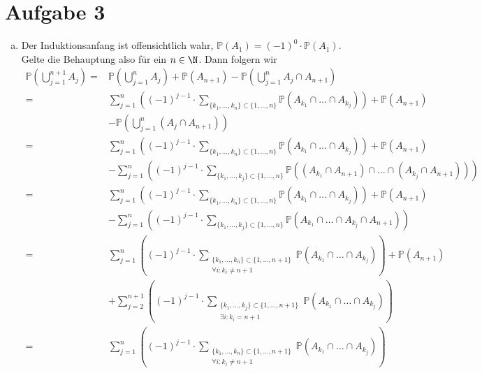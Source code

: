 \documentclass{article}
\newcommand{\IP}{\mathbb{P}}
\begin{document}
    \section*{Aufgabe 3}
    \begin{enumerate}[(a)]
        \item Der Induktionsanfang ist offensichtlich wahr, $\IP(A_1) = (-1)^0 \cdot \IP(A_1)$. Gelte die Behauptung also für ein $n\in \N$. Dann folgern wir
        \begin{align*}
            \IP\left(\bigcup_{j=1}^{n+1} A_j\right) =& \IP\left(\bigcup_{j=1}^{n} A_j\right) + \IP(A_{n+1}) - \IP\left(\bigcup_{j=1}^{n} A_j \cap A_{n+1}\right)\\
            =& \sum_{j = 1}^{n} \left((-1)^{j-1} \cdot \sum_{\{k_1, \dots, k_n\} \subset \{1,\dots, n\}} \IP(A_{k_1} \cap \dots \cap A_{k_j})\right) + \IP(A_{n+1})\\
            &- \IP\left(\bigcup_{j=1}^{n} (A_j \cap A_{n+1})\right)\\
%
            =& \sum_{j = 1}^{n} \left((-1)^{j-1} \cdot \sum_{\{k_1, \dots, k_n\} \subset \{1,\dots, n\}} \IP(A_{k_1} \cap \dots \cap A_{k_j})\right) + \IP(A_{n+1})\\
            &- \sum_{j = 1}^{n} \left((-1)^{j-1} \cdot \sum_{\{k_1,\dots, k_j\} \subset \{1,\dots, n\}} \IP((A_{k_1} \cap A_{n+1}) \cap \dots \cap (A_{k_j} \cap A_{n+1}))\right)\\
%
            =& \sum_{j = 1}^{n} \left((-1)^{j-1} \cdot \sum_{\{k_1, \dots, k_n\} \subset \{1,\dots, n\}} \IP(A_{k_1} \cap \dots \cap A_{k_j})\right) + \IP(A_{n+1})\\
            &- \sum_{j = 1}^{n} \left((-1)^{j-1} \cdot \sum_{\{k_1, \dots, k_j\} \subset \{1,\dots, n\}} \IP(A_{k_1} \cap \dots \cap A_{k_j} \cap A_{n+1})\right)\\
%
            =& \sum_{j = 1}^{n} \left((-1)^{j-1} \cdot \sum_{\substack{\{k_1, \dots, k_n\} \subset \{1,\dots, n+1\}\\\forall i\colon k_i \neq n+1}} \IP(A_{k_1} \cap \dots \cap A_{k_j})\right) + \IP(A_{n+1})\\
            &+ \sum_{j = 2}^{n+1} \left((-1)^{j-1} \cdot \sum_{\substack{\{k_1, \dots, k_j\} \subset \{1,\dots, n+1\}\\\exists i\colon k_i = n+1}} \IP(A_{k_1} \cap \dots \cap A_{k_j})\right)\\
%
            =& \sum_{j = 1}^{n} \left((-1)^{j-1} \cdot \sum_{\substack{\{k_1, \dots, k_n\} \subset \{1,\dots, n+1\}\\\forall i\colon k_i \neq n+1}} \IP(A_{k_1} \cap \dots \cap A_{k_j})\right)\\

\end{align*}
\end{enumerate}
\end{document}
